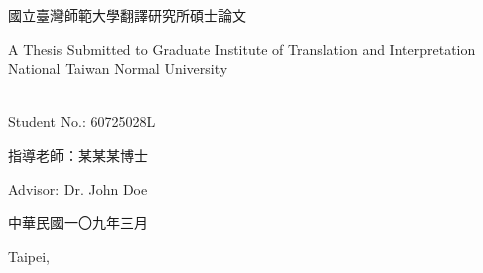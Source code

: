 \makeatletter
\begin{titlepage}%
  \begin{center}%
    {\large 國立臺灣師範大學翻譯研究所碩士論文\par}

    {\large A Thesis Submitted to Graduate Institute of Translation and Interpretation National Taiwan Normal University\par}
    \par
  \end{center}%
  \vspace{1cm plus 1fill}
  \begin{flushleft}%
    {{\Large\bfseries \@author}\\
      Student No.: 60725028L\par}
  \end{flushleft}%
  \vspace{8mm plus 1mm minus 2mm}
  \begin{center}%
    {\Large\textbf{\titlezh}}\par
    \vspace{1em}
    {\huge\textbf{\@title}\par}
    \vspace{2cm plus 1.5fill}
    {\large 指導老師：某某某博士}\par
    \vspace{0.5em}
    {\large Advisor: Dr. John Doe}\par
    \vspace{2cm}
    {\large 中華民國一〇九年三月}\par
    \vspace{0.5em}
    {\large Taipei, \@date}
  \end{center}
\end{titlepage}%
\makeatother